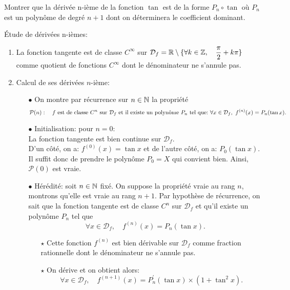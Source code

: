 \documentclass[a4paper, 11pt,reqno]{article}
\begin{document}
\begin{exercice}   \;
	Montrer que la d\'eriv\'ee n-i\`eme de la fonction $\tan{}$ est de la forme $P_n\circ \tan{}$ o\`u $P_n$ est un polyn\^ome de degr\'e $n+1$ dont on d\'eterminera le coefficient dominant.
\end{exercice}
\begin{correction}  \;
	\'Etude de d\'eriv\'ees n-i\`emes:
	\begin{enumerate}
		\item La fonction tangente est de classe $C^{\infty}$ sur $\mathcal{D}_f=\mathbb{R}\setminus\lbrace \forall k\in\mathbb{Z},\quad \displaystyle\frac{\pi}{2}+k\pi \rbrace$ comme quotient de fonctions $C^{\infty}$ dont le d\'enominateur ne s'annule pas.
		\item Calcul de ses d\'eriv\'ees $n$-i\`eme:
		      \begin{itemize}
			      \item[$\bullet$] On montre par r\'ecurrence sur $n\in\mathbb{N}$ la propri\'et\'e
			            $$\mathcal{P}(n):\quad f\ \hbox{est de classe}\ C^n\ \hbox{sur}\ \mathcal{D}_f\ \hbox{et il existe un polyn\^ome}\ P_n\ \hbox{tel que:}\ \forall x\in\mathcal{D}_f,\ f^{(n)}(x)=P_n(\tan{x}).$$
			      \item[$\bullet$]  Initialisation: pour $n=0$:\\
			            La fonction tangente est bien continue sur $\mathcal{D}_f$.\\
			            \noindent D'un c\^ot\'e, on a: $f^{(0)}(x)=\tan{x}$ et de l'autre c\^ot\'e, on a: $P_0(\tan{x})$. Il suffit donc de prendre le polyn\^ome $P_0=X$ qui convient bien. Ainsi, $\mathcal{P}(0)$ est vraie.
			      \item[$\bullet$] H\'er\'edit\'e: soit $n\in\mathbb{N}$ fix\'e. On suppose la propri\'et\'e vraie au rang $n$, montrons qu'elle est vraie au rang $n+1$. Par hypoth\`ese de r\'ecurrence, on sait que la fonction tangente est de classe $C^n$ sur $\mathcal{D}_f$ et qu'il existe un polyn\^ome $P_n$ tel que
			            $$\forall x\in\mathcal{D}_f,\quad f^{(n)}(x)=P_n(\tan{x}).$$
			            \begin{itemize}
				            \item[$\star$] Cette fonction $f^{(n)}$ est bien d\'erivable sur $\mathcal{D}_f$ comme fraction rationnelle dont le d\'enominateur ne s'annule pas.
				            \item[$\star$] On d\'erive et on obtient alors:
				                  $$\forall x\in\mathcal{D}_f,\quad f^{(n+1)}(x)=P_n^{\prime}(\tan{x})\times \left( 1+\tan^2{x}\right).$$

\end{itemize}
\end{itemize}
\end{enumerate}
\end{correction}
\end{document}

